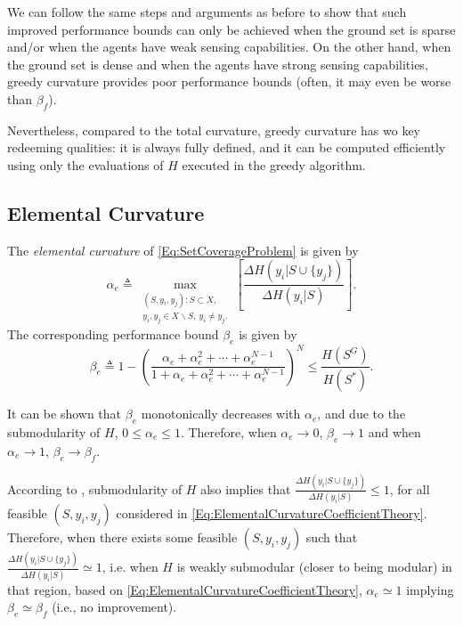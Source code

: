 \documentclass[letterpaper, 10 pt, conference]{ieeeconf}
\begin{document}
We can follow the same steps and arguments as before to show that such improved performance bounds can only be achieved when the ground set is sparse and/or when the agents have weak sensing capabilities. On the other hand, when the ground set is dense and when the agents have strong sensing capabilities, greedy curvature provides poor performance bounds (often, it may even be worse than $\beta_f$). 

Nevertheless, compared to the total curvature, greedy curvature has wo key redeeming qualities: it is always fully defined, and it can be computed efficiently using only the evaluations of $H$ executed in the greedy algorithm.





\subsection{Elemental Curvature \cite{Wang2016}}\label{SubSec:ElementalCurvature}

The \emph{elemental curvature} of \eqref{Eq:SetCoverageProblem} is given by 
\begin{equation}\label{Eq:ElementalCurvatureCoefficientTheory}
    \alpha_e \triangleq \max_{\substack{(S,y_i,y_j): S \subset X,\\ y_i,y_j \in X \backslash S,\ y_i \neq y_j.}}\left[\frac{\Delta H(y_i \vert S \cup \{y_j\})}{\Delta H(y_i \vert S)}\right].
\end{equation}
The corresponding performance bound $\beta_e$ is given by 
\begin{equation}\label{Eq:ElementalCurvatureBoundTheory}
    \beta_e \triangleq 1-\left(\frac{\alpha_e + \alpha_e^2 + \cdots + \alpha_e^{N-1}}{1 + \alpha_e + \alpha_e^2 + \cdots + \alpha_e^{N-1}}\right)^N \leq \frac{H(S^G)}{H(S^*)}.
\end{equation}



It can be shown that $\beta_e$ monotonically decreases with $\alpha_e$, and due to the submodularity of $H$, $0 \leq \alpha_e \leq 1$. Therefore, when $\alpha_e \rightarrow 0$, $\beta_e \rightarrow 1$ and when $\alpha_e \rightarrow 1$, $\beta_e \rightarrow \beta_f$.

According to  \cite[Prop. 2.1]{Nemhauser1978}, submodularity of $H$ also implies that $\frac{\Delta H(y_i \vert S \cup \{y_j\})}{\Delta H(y_i \vert S)} \leq 1$, for all feasible $(S,y_i,y_j)$ considered in \eqref{Eq:ElementalCurvatureCoefficientTheory}. Therefore, when there exists some feasible $(S,y_i,y_j)$ such that  $\frac{\Delta H(y_i \vert S \cup \{y_j\})}{\Delta H(y_i \vert S)} \simeq 1$, i.e. when $H$ is weakly submodular (closer to being modular) in that region, based on \eqref{Eq:ElementalCurvatureCoefficientTheory}, $\alpha_e \simeq 1$ implying $\beta_e \simeq \beta_f$ (i.e., no improvement). 
\end{document}
